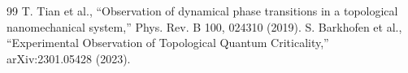\begin{thebibliography}{99}
 T. Tian et al., ``Observation of dynamical phase transitions in a topological nanomechanical system,'' Phys. Rev. B 100, 024310 (2019).
 S. Barkhofen et al., ``Experimental Observation of Topological Quantum Criticality,'' arXiv:2301.05428 (2023).
\end{thebibliography}
